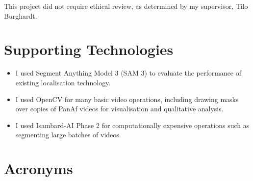 \documentclass[author={Jacob Stephenson},
    degree={BSc},
    title={Robust Great Ape Species Detection in Wild Camera Trap Imagery with Promptable Concept Segmentation},
    unit={COMS30045},
    subtitle={}]{dissertation}
\begin{document}
This project did not require ethical review, as determined by my supervisor, Tilo Burghardt.



\chapter*{Supporting Technologies}

\begin{itemize}
    \item I used Segment Anything Model 3 (SAM 3) \cite{carion2025sam3segmentconcepts} to evaluate the performance of existing localisation technology.
    \item I used OpenCV \cite{opencv_library} for many basic video operations, including drawing masks over copies of PanAf videos for visualisation and qualitative analysis.
    \item I used Isambard-AI Phase 2 \cite{mcintoshsmith2024isambardaileadershipclasssupercomputer} for computationally expensive operations such as segmenting large batches of videos.
\end{itemize}




\chapter*{Acronyms}

\end{document}
